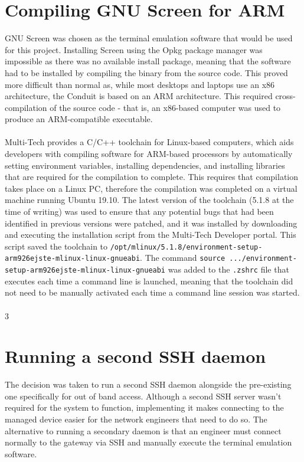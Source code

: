 \section{Compiling GNU Screen for ARM}
\label{section:dev-screenonarm}
GNU Screen was chosen as the terminal emulation software that would be used for this project. Installing Screen using the Opkg package manager was impossible as there was no available install package, meaning that the software had to be installed by compiling the binary from the source code. This proved more difficult than normal as, while most desktops and laptops use an x86 architecture, the Conduit is based on an ARM architecture. This required cross-compilation of the source code - that is, an x86-based computer was used to produce an ARM-compatible executable.\\\\
Multi-Tech provides a C/C++ toolchain for Linux-based computers, which aids developers with compiling software for ARM-based processors by automatically setting environment variables, installing dependencies, and installing libraries that are required for the compilation to complete. This requires that compilation takes place on a Linux PC, therefore the compilation was completed on a virtual machine running Ubuntu 19.10. The latest version of the toolchain (5.1.8 at the time of writing) was used to ensure that any potential bugs that had been identified in previous versions were patched, and it was installed by downloading and executing the installation script from the Multi-Tech Developer portal. This script saved the toolchain to \verb|/opt/mlinux/5.1.8/environment-setup-arm926ejste-mlinux-linux-gnueabi|. The command \verb|source .../environment-setup-arm926ejste-mlinux-linux-gnueabi| was added to the \verb|.zshrc| file that executes each time a command line is launched, meaning that the toolchain did not need to be manually activated each time a command line session was started.\\\\
3

\section{Running a second SSH daemon}
\label{section:dev-sshdaemon}
The decision was taken to run a second SSH daemon alongside the pre-existing one specifically for out of band access. Although a second SSH server wasn't required for the system to function, implementing it makes connecting to the managed device easier for the network engineers that need to do so. The alternative to running a secondary daemon is that an engineer must connect normally to the gateway via SSH and manually execute the terminal emulation software. 
